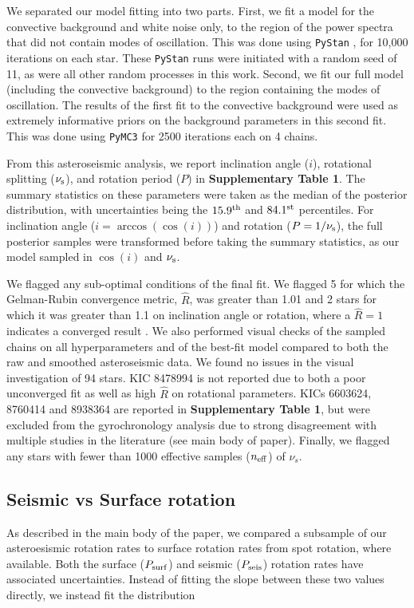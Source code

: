 \documentclass[12pt]{article}
\begin{document}
We separated our model fitting into two parts. First, we fit a model for the convective background and white noise only, to the region of the power spectra that did not contain modes of oscillation. This was done using \texttt{PyStan} \cite{vanhoey+2013, carpenter+2017}, for 10,000 iterations on each star. These \texttt{PyStan} runs were initiated with a random seed of 11, as were all other random processes in this work. Second, we fit our full model (including the convective background) to the region containing the modes of oscillation. The results of the first fit to the convective background were used as extremely informative priors on the background parameters in this second fit. This was done using \texttt{PyMC3} \cite{vanderwalt+2011, salvatier+2016, thetheanodevelopmentteam+2016} for 2500 iterations each on 4 chains.

From this asteroseismic analysis, we report inclination angle ($i$), rotational splitting ($\nu_{\rm s}$), and rotation period ($P$) in \textbf{Supplementary Table 1}. The summary statistics on these parameters were taken as the median of the posterior distribution, with uncertainties being the $15.9^{\rm th}$ and $84.1^{\rm st}$ percentiles. For inclination angle ($i = \arccos(\cos(i))$) and rotation ($P = 1/\nu_{\rm s}$), the full posterior samples were transformed before taking the summary statistics, as our model sampled in $\cos(i)$ and $\nu_{\rm s}$.

We flagged any sub-optimal conditions of the final fit. We flagged 5 for which the Gelman-Rubin convergence metric, $\hat{R}$, was greater than 1.01 and 2 stars for which it was greater than 1.1 on inclination angle or rotation, where a $\hat{R} = 1$ indicates a converged result \cite{gelman+rubin1992}. We also performed visual checks of the sampled chains on all hyperparameters and of the best-fit model compared to both the raw and smoothed asteroseismic data. We found no issues in the visual investigation of 94 stars. KIC 8478994 is not reported due to both a poor unconverged fit as well as high $\hat{R}$ on rotational parameters. KICs 6603624, 8760414 and 8938364 are reported in  \textbf{Supplementary Table 1}, but were excluded from the gyrochronology analysis due to strong disagreement with multiple studies in the literature (see main body of paper). Finally, we flagged any stars with fewer than 1000 effective samples ($n_{\rm eff}$) of $\nu_s$.

\subsection{Seismic vs Surface rotation}
As described in the main body of the paper, we compared a subsample of our asteroesismic rotation rates to surface rotation rates from spot rotation, where available. Both the surface ($P_{\rm surf}$) and seismic ($P_{\rm seis}$) rotation rates have associated uncertainties. Instead of fitting the slope between these two values directly, we instead fit the distribution
\end{document}
